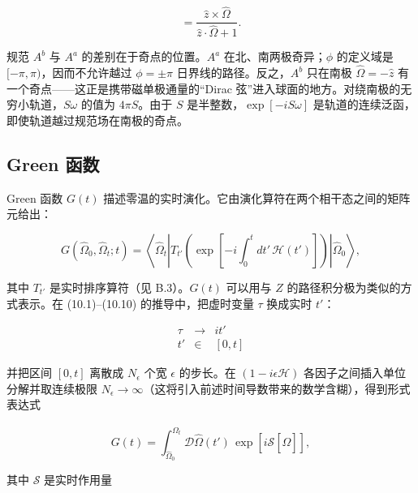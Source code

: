 \begin{equation*}
= \frac {\hat {z} \times \hat {\Omega}}{\hat {z} \cdot \hat {\Omega} + 1}.
\tag{10.18}
\end{equation*}

规范 $A^{b}$ 与 $A^{a}$ 的差别在于奇点的位置。$A^{a}$ 在北、南两极奇异；$\phi$ 的定义域是 $[-\pi, \pi)$，因而不允许越过 $\phi = \pm\pi$ 日界线的路径。反之，$A^{b}$ 只在南极 $\hat{\Omega} = -\hat{z}$ 有一个奇点——这正是携带磁单极通量的“Dirac 弦”进入球面的地方。对绕南极的无穷小轨道，$S\omega$ 的值为 $4\pi S$。由于 $S$ 是半整数，$\exp[-iS\omega]$ 是轨道的连续泛函，即使轨道越过规范场在南极的奇点。

\subsection{Green 函数}

Green 函数 $G(t)$ 描述零温的实时演化。它由演化算符在两个相干态之间的矩阵元给出：

\begin{equation*}
G ( \hat {\Omega} _ {0}, \hat {\Omega} _ {t}; t ) = \left\langle \hat {\Omega} _ {t} \left| T _ {t '} \left( \exp \left[ - i \int_ {0} ^ {t} d t ' \, \mathcal {H} ( t ' ) \right] \right) \right| \hat {\Omega} _ {0} \right\rangle ,
\tag{10.19}
\end{equation*}

其中 $T_{t'}$ 是实时排序算符（见 B.3）。$G(t)$ 可以用与 $Z$ 的路径积分极为类似的方式表示。在 (10.1)--(10.10) 的推导中，把虚时变量 $\tau$ 换成实时 $t'$：

\begin{equation*}
\begin{array}{ccc}
\tau & \to & i t '\\
t ' & \in & [ 0, t ]
\end{array}
\tag{10.20}
\end{equation*}

并把区间 $[0,t]$ 离散成 $N_{\epsilon}$ 个宽 $\epsilon$ 的步长。在 $(1-i\epsilon\mathcal{H})$ 各因子之间插入单位分解并取连续极限 $N_{\epsilon}\to\infty$（这将引入前述时间导数带来的数学含糊），得到形式表达式

\begin{equation*}
G ( t ) = \int_{\hat {\Omega} _ {0}} ^ {\hat {\Omega} _ {t}} \mathcal {D} \hat {\Omega} ( t ' ) \, \exp \left[ i \mathcal {S} [ \hat {\Omega} ] \right] ,
\tag{10.21}
\end{equation*}

其中 $\mathcal{S}$ 是实时作用量

